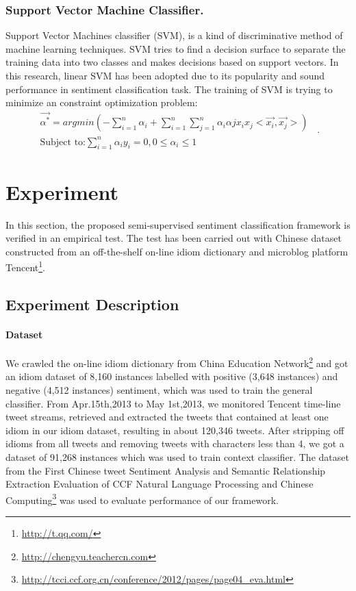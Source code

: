 \subsubsection{Support Vector Machine Classifier.}
\label{svm}
Support Vector Machines classifier (SVM), is a kind of discriminative method of machine learning techniques.
SVM tries to find a decision surface to separate the training data into two classes and makes decisions based on support vectors. 
In this research, linear SVM has been adopted due to its popularity and sound performance in sentiment classification task.
The training of SVM is trying to minimize an constraint optimization problem:
\begin{equation}
\label{e7}
\begin{aligned}
\overrightarrow{\alpha^{\ast}}=argmin \left( -\sum_{i=1}^{n}\alpha_{i} + \sum_{i=1}^{n} \sum_{j=1}^{n}\alpha_{i}\alpha{j} x_{i}x_{j}<\overrightarrow{x_{i}},\overrightarrow{x_{j}}> \right)\\
\mbox{Subject to:} \sum_{i=1}^{n}\alpha_{i}y_{i}=0 , 0\leqslant \alpha_{i} \leqslant 1
\end{aligned} \enspace .
\end{equation}

\section{Experiment}
\label{experiment}

In this section, the proposed semi-supervised sentiment classification framework is verified in an empirical test. 
The test has been carried out with Chinese dataset constructed from an off-the-shelf on-line idiom dictionary and microblog platform Tencent\footnote{\url{http://t.qq.com/}}. 

\subsection{Experiment Description}
\label{description}

\paragraph{Dataset}
We crawled the on-line idiom dictionary from China Education Network\footnote{\url{http://chengyu.teachercn.com}} and got an idiom dataset of 8,160 instances labelled with positive (3,648 instances) and negative (4,512 instances) sentiment, which was used to train the general classifier. 
From Apr.15th,2013 to May 1st,2013, we monitored Tencent time-line tweet streams, retrieved and extracted the tweets that contained at least one idiom in our idiom dataset, resulting in about 120,346 tweets. 
After stripping off idioms from all tweets and removing tweets with characters less than 4, we got a dataset of 91,268 instances which was used to train context classifier. 
The dataset from the First Chinese tweet Sentiment Analysis and Semantic Relationship Extraction Evaluation of CCF Natural Language Processing and Chinese Computing\footnote{\url{http://tcci.ccf.org.cn/conference/2012/pages/page04_eva.html}} was used to evaluate performance of our framework. 
